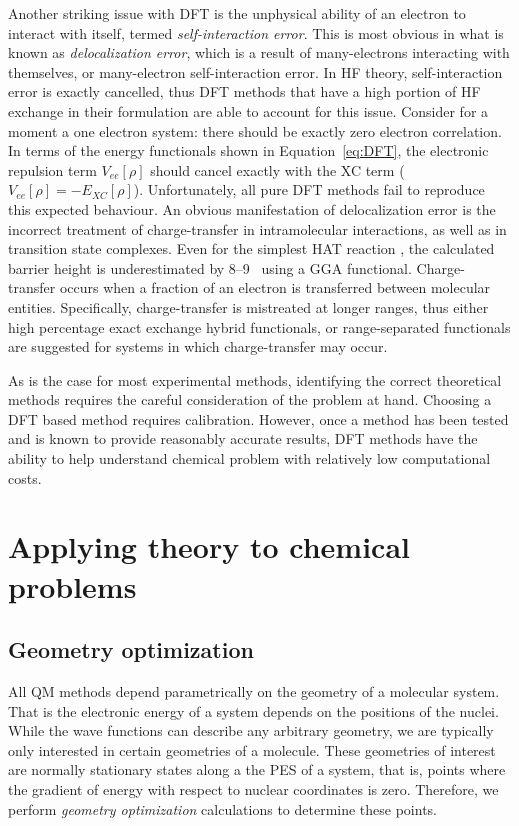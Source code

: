 \begin{doublespace}
Another striking issue with DFT is the unphysical ability of an electron to
interact with itself, termed \emph{self-interaction error}. This is most
obvious in what is known as \emph{delocalization error}, which is a result of
many-electrons interacting with themselves, or many-electron self-interaction
error. In HF theory, self-interaction error is exactly cancelled, thus DFT
methods that have a high portion of HF exchange in their formulation are able
to account for this issue. Consider for a moment a one electron system: there
should be exactly zero electron correlation. In terms of the energy functionals
shown in Equation~\ref{eq:DFT}, the electronic repulsion term $V_{ee}[\rho]$
should cancel exactly with the XC term ($V_{ee}[\rho] =
-E_{XC}[\rho]$).\cite{Cramer2004} Unfortunately, all pure DFT methods fail to
reproduce this expected behaviour. An obvious manifestation of delocalization
error is the incorrect treatment of charge-transfer in intramolecular
interactions,\cite{MoriSanchez2008,OterodelaRoza2014} as well as in transition
state complexes. Even for the simplest HAT reaction ,
the calculated barrier height is underestimated by 8--9 \kcalmol\ using a GGA
functional.\cite{Csonka1998} Charge-transfer occurs when a fraction of an
electron is transferred between molecular entities. Specifically,
charge-transfer is mistreated at longer ranges, thus either high percentage
exact exchange hybrid functionals, or range-separated functionals are suggested
for systems in which charge-transfer may occur.

As is the case for most experimental methods, identifying the correct
theoretical methods requires the careful consideration of the problem at hand.
Choosing a DFT based method requires calibration. However, once a method has
been tested and is known to provide reasonably accurate results, DFT methods
have the ability to help understand chemical problem with relatively low
computational costs.

\section{Applying theory to chemical problems}

\subsection{Geometry optimization}

All QM methods depend parametrically on the geometry of a molecular system. That
is the electronic energy of a system depends on the positions of the nuclei.
While the wave functions can describe any arbitrary geometry, we are typically
only interested in certain geometries of a molecule. These geometries of
interest are normally stationary states along a the PES of a system, that is,
points where the gradient of energy with respect to nuclear coordinates is zero.
Therefore, we perform \emph{geometry optimization} calculations to determine
these points.


\end{doublespace}
